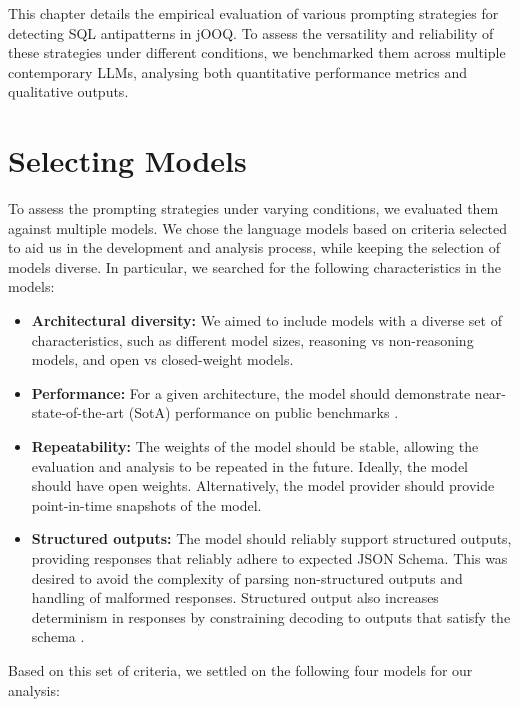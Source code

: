 This chapter details the empirical evaluation of various prompting strategies for detecting SQL antipatterns in jOOQ. To assess the versatility and reliability of these strategies under different conditions, we benchmarked them across multiple contemporary LLMs, analysing both quantitative performance metrics and qualitative outputs.

\section{Selecting Models}\label{sec:models}

To assess the prompting strategies under varying conditions, we evaluated them against multiple models. We chose the language models based on criteria selected to aid us in the development and analysis process, while keeping the selection of models diverse. In particular, we searched for the following characteristics in the models:

\begin{itemize}
    \item \textbf{Architectural diversity:} We aimed to include models with a diverse set of characteristics, such as different model sizes, reasoning vs non-reasoning models, and open vs closed-weight models.
    \item \textbf{Performance:} For a given architecture, the model should demonstrate near-state-of-the-art (SotA) performance on public benchmarks .
    \item \textbf{Repeatability:} The weights of the model should be stable, allowing the evaluation and analysis to be repeated in the future. Ideally, the model should have open weights. Alternatively, the model provider should provide point-in-time snapshots of the model.
    \item \textbf{Structured outputs:} The model should reliably support structured outputs, providing responses that reliably adhere to expected JSON Schema. This was desired to avoid the complexity of parsing non-structured outputs and handling of malformed responses. Structured output also increases determinism in responses by constraining decoding to outputs that satisfy the schema .
\end{itemize}

Based on this set of criteria, we settled on the following four models for our analysis:

